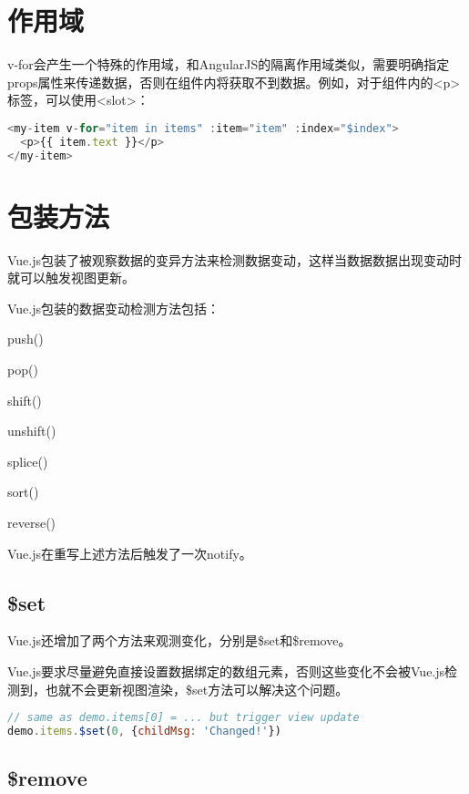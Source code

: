 \section{作用域}

v-for会产生一个特殊的作用域，和AngularJS的隔离作用域类似，需要明确指定props属性来传递数据，否则在组件内将获取不到数据。例如，对于组件内的<p>标签，可以使用<slot>：


\begin{lstlisting}[language=JavaScript]
<my-item v-for="item in items" :item="item" :index="$index">
  <p>{{ item.text }}</p>
</my-item>
\end{lstlisting}

\section{包装方法}

Vue.js包装了被观察数据的变异方法来检测数据变动，这样当数据数据出现变动时就可以触发视图更新。


Vue.js包装的数据变动检测方法包括：

\begin{compactitem}
\item push()
\item pop()
\item shift()
\item unshift()
\item splice()
\item sort()
\item reverse()
\end{compactitem}


Vue.js在重写上述方法后触发了一次notify。


\subsection{\$set}

Vue.js还增加了两个方法来观测变化，分别是\$set和\$remove。

Vue.js要求尽量避免直接设置数据绑定的数组元素，否则这些变化不会被Vue.js检测到，也就不会更新视图渲染，\$set方法可以解决这个问题。




\begin{lstlisting}[language=JavaScript]
// same as demo.items[0] = ... but trigger view update
demo.items.$set(0, {childMsg: 'Changed!'})
\end{lstlisting}


\subsection{\$remove}

